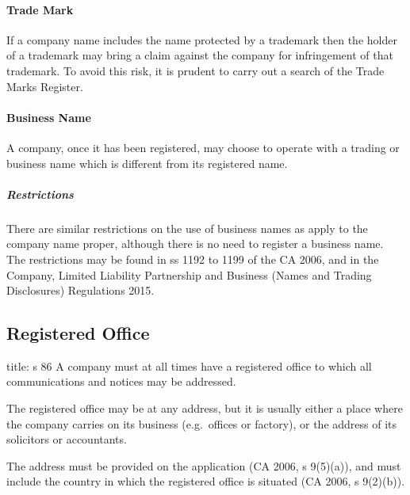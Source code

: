 \documentclass[
]{article}
\newenvironment{Shaded}{}{}
\newcommand{\NormalTok}[1]{#1}
\begin{document}
\hypertarget{trade-mark}{%
\paragraph{Trade Mark}\label{trade-mark}}

If a company name includes the name protected by a trademark then the
holder of a trademark may bring a claim against the company for
infringement of that trademark. To avoid this risk, it is prudent to
carry out a search of the Trade Marks Register.

\hypertarget{business-name}{%
\paragraph{Business Name}\label{business-name}}

A company, once it has been registered, may choose to operate with a
trading or business name which is different from its registered name.

\hypertarget{restrictions-2}{%
\subparagraph{Restrictions}\label{restrictions-2}}

There are similar restrictions on the use of business names as apply to
the company name proper, although there is no need to register a
business name. The restrictions may be found in ss 1192 to 1199 of the
CA 2006, and in the Company, Limited Liability Partnership and Business
(Names and Trading Disclosures) Regulations 2015.

\hypertarget{registered-office}{%
\subsection{Registered Office}\label{registered-office}}

\begin{Shaded}
\begin{Highlighting}[]
\NormalTok{title: s 86}
\NormalTok{A company must at all times have a registered office to which all communications and notices may be addressed. }
\end{Highlighting}
\end{Shaded}

The registered office may be at any address, but it is usually either a
place where the company carries on its business (e.g.~offices or
factory), or the address of its solicitors or accountants.

The address must be provided on the application (CA 2006, s 9(5)(a)),
and must include the country in which the registered office is situated
(CA 2006, s 9(2)(b)).
\end{document}
